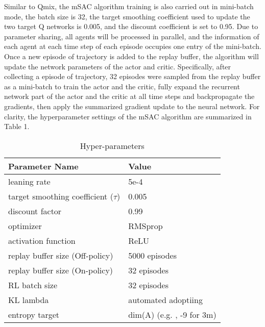 \documentclass[runningheads]{llncs}
\begin{document}
 Similar to Qmix, the mSAC algorithm training is also carried out in mini-batch mode, the batch size is 32, the target smoothing coefficient used to update the two target Q networks is 0.005, and the discount coefficient is set to 0.95.
 Due to parameter sharing, all agents will be processed in parallel, and the information of each agent at each time step of each episode occupies one entry of the mini-batch. Once a new episode of trajectory is added to the replay buffer, the algorithm will update the network parameters of the actor and critic.
 Specifically, after collecting a episode of trajectory, 32 episodes were sampled from the replay buffer as a mini-batch to train the actor and the critic, fully expand the recurrent network part of the actor and the critic at all time steps and backpropagate the gradients, then apply the summarized gradient update to the neural network. For clarity, the hyperparameter settings of the mSAC algorithm are summarized in Table 1.
 
 \begin{table}[!htbp]
	\centering
	\caption{Hyper-parameters}
	\begin{tabular}{ll}		
		\hline
		Parameter Name   & Value  \\
		\hline
		leaning rate      & 5e-4     \\
target smoothing coefficient ($\tau$) & 0.005\\
		discount factor          & 0.99        \\
		optimizer         & RMSprop      \\
		activation function   & ReLU      \\
		replay buffer size (Off-policy)    & 5000 episodes   \\
		replay buffer size (On-policy)     & 32 episodes   \\
RL batch size        & 32 episodes    \\		
		KL lambda & automated adoptiing \\
		entropy target & dim(A) (e.g. , -9 for 3m) \\
		
\hline
	\end{tabular}
	\label{tab:booktabs}
\end{table}
\end{document}
